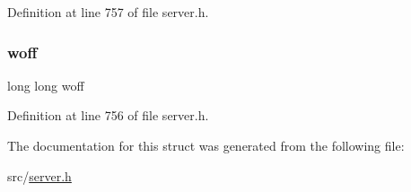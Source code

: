 Definition at line 757 of file server.\+h.

\mbox{\label{structclient_af59577028441c0e9c8361e112706e6c5}} 
\subsubsection{\texorpdfstring{woff}{woff}}
{\footnotesize\ttfamily long long woff}



Definition at line 756 of file server.\+h.



The documentation for this struct was generated from the following file\+:\begin{DoxyCompactItemize}
\item 
src/\hyperlink{server_8h}{server.\+h}\end{DoxyCompactItemize}
